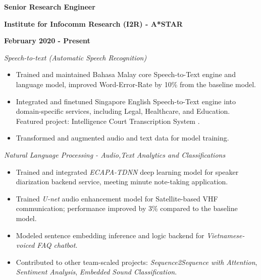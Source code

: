 \documentclass[10pt]{article}
\newcommand{\blackhref}[3][black]{\href{#2}{\color{#1}{#3}}}%
\begin{document}
        \begin{multicols}{3}
            \begin{flushleft}
                \textbf{Senior Research Engineer}
            \end{flushleft}

            \columnbreak

            \begin{center}
                \textbf{Institute for Infocomm Research (I2R) - A*STAR}
            \end{center}

            \columnbreak

            \begin{flushright}
                \textbf{February 2020 - Present}
            \end{flushright}
        \end{multicols}

        \vspace{-5mm}
        \emph{Speech-to-text (Automatic Speech Recognition)}
        \vspace{-2.5mm}
        \begin{itemize}[noitemsep]
            \item Trained and maintained Bahasa Malay core Speech-to-Text engine and language model, improved Word-Error-Rate by 10\% from the baseline model.
            \item Integrated and finetuned Singapore English Speech-to-Text engine into domain-specific services, including Legal, Healthcare, and Education. Featured project: Intelligence Court Transcription System \blackhref{https://www.straitstimes.com/singapore/courts-crime/state-courts-to-use-system-that-instantly-transcribes-court-proceedings}{\faLink}.
            \item Transformed and augmented audio and text data for model training.
        \end{itemize}

        \emph{Natural Language Processing - Audio,Text Analytics and Classifications}
        \vspace{-2.5mm}
        \begin{itemize}[noitemsep]
            \item Trained and integrated \emph{ECAPA-TDNN} deep learning model for speaker diarization backend service, meeting minute note-taking application.
            \item Trained \emph{U-net} audio enhancement model for Satellite-based VHF communication; performance improved by 3\% compared to the baseline model.
            \item Modeled sentence embedding inference and logic backend for \emph{Vietnamese-voiced FAQ chatbot}.
            \item Contributed to other team-scaled projects: \emph{Sequence2Sequence with Attention}, \emph{Sentiment Analysis}, \emph{Embedded Sound Classification}.
        \end{itemize}
\end{document}

